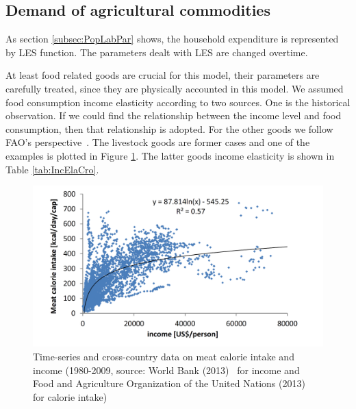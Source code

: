 \documentclass[10pt,a4paper,titlepage,dvipdfmx]{book}
\begin{document}
\subsection{\label{subsec:DemAgrCom}Demand of agricultural commodities}

As section \ref{subsec:PopLabPar} shows, the household expenditure is represented by LES function. The parameters dealt with LES are changed overtime.

At least food related goods are crucial for this model, their parameters are carefully treated, since they are physically accounted in this model. We assumed food consumption income elasticity according to two sources. One is the historical observation. If we could find the relationship between the income level and food consumption, then that relationship is adopted. For the other goods we follow FAO's perspective~\cite{RN2725}. The livestock goods are former cases and one of the examples is plotted in Figure \ref{fig:MeatCal}. The latter goods income elasticity is shown in Table \ref{tab:IncElaCro}.
\begin{figure}
\includegraphics[width=1\textwidth]{fig/image21.png}
\caption{Time-series and cross-country data on meat calorie intake and income (1980-2009, source: World Bank (2013)~\cite{RN3647} for income and Food and Agriculture Organization of the United Nations (2013)~\cite{RN3272} for calorie intake)}
\label{fig:MeatCal}
\end{figure}
\end{document}
